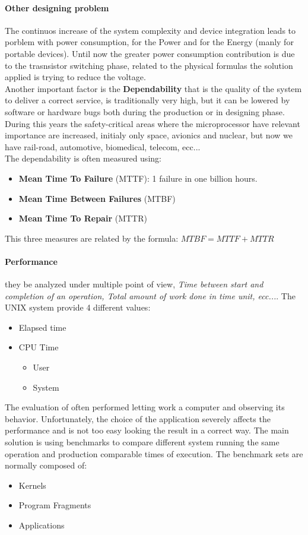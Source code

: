 \documentclass[12pt]{article}
\begin{document}
\paragraph{Other designing problem} The continuos increase of the system complexity and device integration leads to porblem with power consumption, for the Power and for the Energy (manly for portable devices). Until now the greater power consumption contribution is due to the trasnsistor switching phase, related to the physical formulas the solution applied is trying to reduce the voltage.\\
Another important factor is the \textbf{Dependability} that is the quality of the system to deliver a correct service, is traditionally very high, but it can be lowered by software or hardware bugs both during the production or in designing phase. During this years the safety-critical areas where the microprocessor have relevant importance are increased, initialy only space, avionics and nuclear, but now we have rail-road, automotive, biomedical, telecom, ecc...\\
The dependability is often measured using:
\begin{itemize}
  \item \textbf{Mean Time To Failure} (MTTF): 1 failure in one billion hours.
  \item \textbf{Mean Time Between Failures} (MTBF)
  \item \textbf{Mean Time To Repair} (MTTR)
\end{itemize}
This three measures are related by the formula: $MTBF = MTTF + MTTR$

\paragraph{Performance} they be analyzed under multiple point of view, \textit{Time between start and completion of an operation, Total amount of work done in time unit, ecc...}. The UNIX system provide 4 different values:
\begin{itemize}
  \item Elapsed time
  \item CPU Time
  \begin{itemize}
    \item User
    \item System
  \end{itemize}
\end{itemize}
The evaluation of often performed letting work a computer and observing its behavior. Unfortunately, the choice of the application severely affects the performance and is not too easy looking the result in a correct way. The main solution is using benchmarks to compare different system running the same operation and production comparable times of execution. The benchmark sets are normally composed of:
\begin{itemize}
  \item Kernels
  \item Program Fragments
  \item Applications
\end{itemize}
\end{document}
